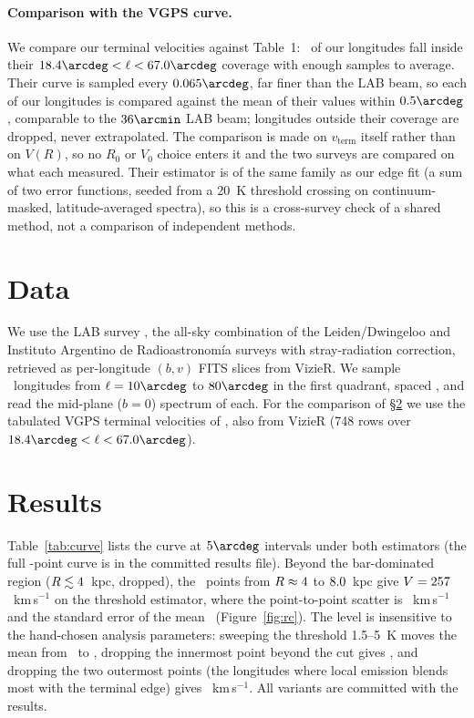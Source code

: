 \documentclass[twocolumn]{aastex631}
\begin{document}
\paragraph{Comparison with the VGPS curve.} We compare our terminal velocities against
\citet{mccluregriffiths2016} Table~1: \hiRealRefN\ of our longitudes fall inside their
$18.4\arcdeg < \ell < 67.0\arcdeg$ coverage with enough samples to average. Their curve is sampled
every $0.065\arcdeg$, far finer than the LAB beam, so each of our longitudes is compared against the
mean of their values within $0.5\arcdeg$, comparable to the $36\arcmin$ LAB beam; longitudes
outside their coverage are dropped, never extrapolated. The comparison is made on $v_\mathrm{term}$ itself rather than on
$V(R)$, so no $R_0$ or $V_0$ choice enters it and the two surveys are compared on what each
measured. Their estimator is of the same family as our edge fit (a sum of two error functions,
seeded from a 20~K threshold crossing on continuum-masked, latitude-averaged spectra), so this is
a cross-survey check of a shared method, not a comparison of independent methods.

\section{Data}
We use the LAB survey \citep{kalberla2005}, the all-sky combination of the Leiden/Dwingeloo and
Instituto Argentino de Radioastronom\'ia surveys with stray-radiation correction, retrieved as
per-longitude $(b,v)$ FITS slices from VizieR. We sample \hiNlong\ longitudes from $\ell=10\arcdeg$ to
$80\arcdeg$ in the first quadrant, spaced \hiStep\arcdeg, and read the mid-plane ($b=0$) spectrum of
each. For the comparison of \S\ref{sec:results} we use the tabulated VGPS terminal velocities of
\citet{mccluregriffiths2016}, also from VizieR (748 rows over
$18.4\arcdeg < \ell < 67.0\arcdeg$).

\section{Results}
\label{sec:results}
Table~\ref{tab:curve} lists the curve at $5\arcdeg$ intervals under both estimators (the full
\hiNlong-point curve is in the committed results file). Beyond the bar-dominated region
($R\lesssim4$~kpc, dropped), the \hiRealNflat\ points from $R\approx4$ to
$8.0$~kpc give $V=257$~km\,s$^{-1}$ on the threshold estimator, where the
point-to-point scatter is \hiRealVflatScatter~km\,s$^{-1}$ and the standard error of the mean
\hiRealVflatSem\ (Figure~\ref{fig:rc}). The level is insensitive to the hand-chosen analysis
parameters: sweeping the threshold 1.5--5~K moves the mean from \hiRealSweepLoThr\ to
\hiRealSweepHiThr, dropping the innermost point beyond the cut gives \hiRealDropInner, and dropping
the two outermost points (the longitudes where local emission blends most with the terminal edge)
gives \hiRealDropOuterTwo~km\,s$^{-1}$. All variants are committed with the results.
\end{document}
